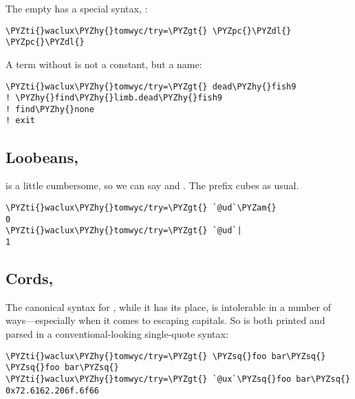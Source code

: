 The empty  has a special syntax, \kode{\$}:

\begin{framed_shaded}
\begin{Verbatim}[fontsize=\relsize{-2.5},fontseries=b,commandchars=\\\{\}]
\PYZti{}waclux\PYZhy{}tomwyc/try=\PYZgt{} \PYZpc{}\PYZdl{}
\PYZpc{}\PYZdl{}
\end{Verbatim}
\end{framed_shaded}

A term without \kode{\%} is not a constant, but a name:

\begin{framed_shaded}
\begin{Verbatim}[fontsize=\relsize{-2.5},fontseries=b,commandchars=\\\{\}]
\PYZti{}waclux\PYZhy{}tomwyc/try=\PYZgt{} dead\PYZhy{}fish9
! \PYZhy{}find\PYZhy{}limb.dead\PYZhy{}fish9
! find\PYZhy{}none
! exit
\end{Verbatim}
\end{framed_shaded}

\subsection{Loobeans, }

 is a little cumbersome, so we can say \kode{\&} and \kode{\textbar{}}.
The \kode{\%} prefix cubes as usual.

\begin{framed_shaded}
\begin{Verbatim}[fontsize=\relsize{-2.5},fontseries=b,commandchars=\\\{\}]
\PYZti{}waclux\PYZhy{}tomwyc/try=\PYZgt{} `@ud`\PYZam{}
0
\PYZti{}waclux\PYZhy{}tomwyc/try=\PYZgt{} `@ud`|
1
\end{Verbatim}
\end{framed_shaded}

\subsection{Cords, }

The canonical \kode{\sig\sig} syntax for , while it has its place,
is intolerable in a number of ways---especially when it comes to
escaping capitals.  So  is both printed and parsed in a
conventional-looking single-quote syntax:

\begin{framed_shaded}
\begin{Verbatim}[fontsize=\relsize{-2.5},fontseries=b,commandchars=\\\{\}]
\PYZti{}waclux\PYZhy{}tomwyc/try=\PYZgt{} \PYZsq{}foo bar\PYZsq{}
\PYZsq{}foo bar\PYZsq{}
\PYZti{}waclux\PYZhy{}tomwyc/try=\PYZgt{} `@ux`\PYZsq{}foo bar\PYZsq{}
0x72.6162.206f.6f66
\end{Verbatim}
\end{framed_shaded}


